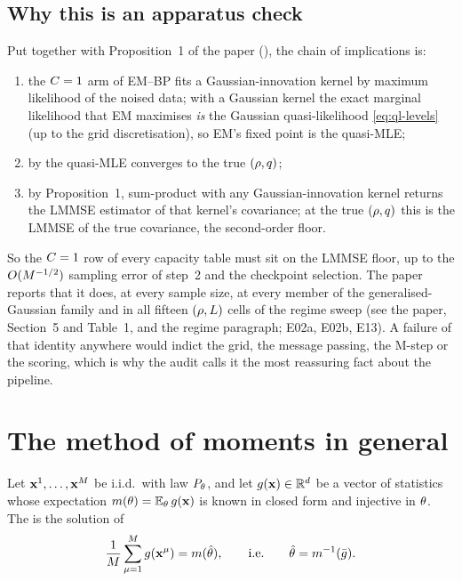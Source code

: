 \subsection{Why this is an apparatus check}

Put together with Proposition~1 of the paper (), the
chain of implications is:
\begin{enumerate}
\item the $C=1$ arm of EM--BP fits a Gaussian-innovation kernel by maximum
  likelihood of the noised data; with a Gaussian kernel the exact marginal likelihood that
  EM maximises \emph{is} the Gaussian quasi-likelihood \cref{eq:ql-levels} (up to the grid
  discretisation), so EM's fixed point is the quasi-MLE;
\item by  the quasi-MLE converges to the true $(\rho,q)$;
\item by Proposition~1, sum-product with any Gaussian-innovation kernel returns the LMMSE
  estimator of that kernel's covariance; at the true $(\rho,q)$ this is the LMMSE of
  the true covariance, the second-order floor.
\end{enumerate}
So the $C=1$ row of every capacity table must sit on the LMMSE floor, up to the
$O(M^{-1/2})$ sampling error of step~2 and the checkpoint selection. The paper
reports that it does, at every sample size, at every member of the generalised-Gaussian
family and in all fifteen $(\rho,L)$ cells of the regime sweep (see the paper,
Section~5 and Table~1, and the regime paragraph; E02a, E02b, E13). A failure of that
identity anywhere would indict the grid, the message passing, the M-step or the scoring,
which is why the audit calls it the most reassuring fact about the pipeline.

\section{The method of moments in general}
\label{sec:mom-general}

\begin{definition}
\label{def:mom}
Let $\mathbf{x}^1,\dots,\mathbf{x}^{M}$ be i.i.d.\ with law $P_{\theta}$, and let
$g(\mathbf{x})\in\mathbb{R}^d$ be a vector of statistics whose expectation
$m(\theta)=\mathbb{E}_{\theta}\,g(\mathbf{x})$ is known in closed form and injective in $\theta$. The
 is the solution of
\begin{equation}
  \frac{1}{M}\sum_{\mu=1}^{M}g(\mathbf{x}^\mu)=m(\hat{\theta}),
  \qquad\text{i.e.}\qquad \hat{\theta}=m^{-1}(\bar g).
  \label{eq:mom}
\end{equation}
\end{definition}

